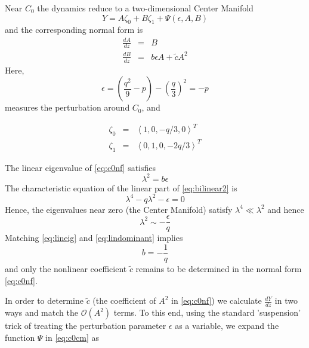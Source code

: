 Near $C_0$ the dynamics reduce to a two-dimensional Center Manifold
\begin{equation}\label{eq:c0cm}
 Y = A \zeta_0 + B \zeta_1 + \Psi(\epsilon,A,B)
\end{equation}
and the corresponding normal form is
\begin{subequations}\label{eq:c0nf}
\begin{eqnarray}
\frac{dA}{dz} &=& B \label{eq:c0nfa} \\
\frac{dB}{dz} &=& b \epsilon A + \tilde{c} A^2 \label{eq:c0nfb}
\end{eqnarray}
\end{subequations}
Here,
\begin{equation}
\epsilon = \left( \frac{q^2}{9} - p\right) - \left(\frac{q}{3}\right)^2 = - p 
\end{equation}
measures the perturbation around $C_0$, and

\begin{subequations}\label{eq:lineareigs}
\begin{eqnarray}
\zeta_0 &=& \left<1,0,-q/3,0\right>^T\\
\zeta_1 &=& \left<0,1,0,-2 q/3\right>^T 
\end{eqnarray}
\end{subequations}

The linear eigenvalue of \eqref{eq:c0nf} satisfies 
\begin{equation}\label{eq:lineig}
\lambda^2 = b \epsilon 
\end{equation}
The characteristic equation of the linear part of 
\eqref{eq:bilinear2} is 
\begin{equation}\label{eq:charlinear}
\lambda^4 - q \lambda^2 - \epsilon =  0 
\end{equation}
Hence, the eigenvalues near zero (the Center Manifold) satisfy $\lambda^4 \ll \lambda^2$ and hence 
\begin{equation}\label{eq:lindominant}
\lambda^2 \sim -\frac{\epsilon}{q}
\end{equation}
Matching \eqref{eq:lineig} and \eqref{eq:lindominant} implies
\begin{equation}
b = - \frac{1}{q}
\end{equation}
and only the nonlinear coefficient $\tilde{c}$ remains to be determined in the normal form \eqref{eq:c0nf}.

In order to determine $\tilde{c}$ (the coefficient of $A^2$ in \eqref{eq:c0nf})
we calculate $\frac{dY}{dz}$ in two ways and match the $\mathcal{O}(A^2)$
terms.  To this end, using the standard 'suspension' trick of treating the
perturbation parameter $\epsilon$ as a variable, we expand the function $\Psi$
in \eqref{eq:c0cm} as 

